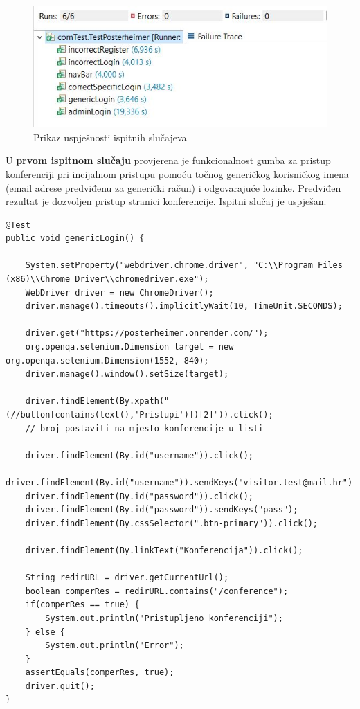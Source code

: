 			\begin{figure} [hbt!]
				\includegraphics[width=\linewidth]{Slike/testResults}
				\caption{Prikaz uspješnosti ispitnih slučajeva}
			\end{figure}
			
			U \textbf{prvom ispitnom slučaju} provjerena je funkcionalnost gumba za pristup konferenciji pri incijalnom pristupu pomoću točnog generičkog korisničkog imena (email adrese predviđenu za generički račun) i odgovarajuće lozinke. Predviđen rezultat je dozvoljen pristup stranici konferencije. Ispitni slučaj je uspješan.
			
			
			\begin{lstlisting}
@Test
public void genericLogin() {
	
	System.setProperty("webdriver.chrome.driver", "C:\\Program Files (x86)\\Chrome Driver\\chromedriver.exe");
	WebDriver driver = new ChromeDriver();
	driver.manage().timeouts().implicitlyWait(10, TimeUnit.SECONDS);
	
	driver.get("https://posterheimer.onrender.com/");
	org.openqa.selenium.Dimension target = new  org.openqa.selenium.Dimension(1552, 840);
	driver.manage().window().setSize(target);
	
	driver.findElement(By.xpath("(//button[contains(text(),'Pristupi')])[2]")).click();
	// broj postaviti na mjesto konferencije u listi
	
	driver.findElement(By.id("username")).click();
	driver.findElement(By.id("username")).sendKeys("visitor.test@mail.hr");
	driver.findElement(By.id("password")).click();
	driver.findElement(By.id("password")).sendKeys("pass");
	driver.findElement(By.cssSelector(".btn-primary")).click();
	
	driver.findElement(By.linkText("Konferencija")).click();
	
	String redirURL = driver.getCurrentUrl();
	boolean comperRes = redirURL.contains("/conference");
	if(comperRes == true) {
		System.out.println("Pristupljeno konferenciji");
	} else {
		System.out.println("Error");
	}
	assertEquals(comperRes, true);
	driver.quit();
}
			\end{lstlisting}
			

